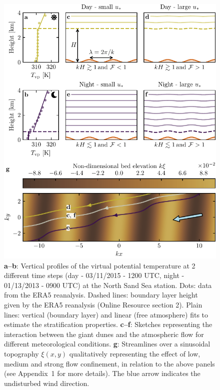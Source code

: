 \begin{figure}
\centering
\includegraphics[scale=1]{Figures/Figure7.pdf}
\caption{\textbf{a--b}: Vertical profiles of the virtual potential temperature at 2 different time steps (day - 03/11/2015 - 1200 UTC, night - 01/13/2013 - 0900 UTC) at the North Sand Sea station. Dots: data from the ERA5 reanalysis. Dashed lines: boundary layer height given by the ERA5 reanalysis (Online Resource section 2). Plain lines: vertical (boundary layer) and linear (free atmosphere) fits to estimate the stratification properties. \textbf{c--f}: Sketches representing the interaction between the giant dunes and the atmospheric flow for different meteorological conditions. \textbf{g}: Streamlines over a sinusoidal topography $\xi(x,y)$ qualitatively representing the effect of low, medium and strong flow confinement, in relation to the above panels (see Appendix~1 for more details). The blue arrow indicates the undisturbed wind direction.}
\label{Fig7}
\end{figure}


